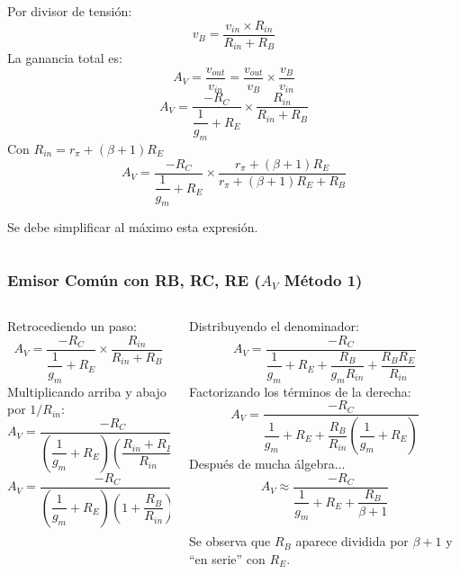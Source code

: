 \begin{frame}[t]
\begin{columns}
        \begin{column}{0.55\textwidth}
        
            Por divisor de tensión:
            \[ v_B = \dfrac{v_{in}\times R_{in}}{R_{in}+R_B} \]
            La ganancia total es:
            \[ A_V = \dfrac{v_{out}}{v_{in}} = \dfrac{v_{out}}{v_{B}}\times\dfrac{v_B}{v_{in}} \]
            \[ A_V = \dfrac{-R_C}{\dfrac{1}{g_m} + R_E} \times \dfrac{R_{in}}{R_{in}+R_B} \]
            Con $R_{in}=r_\pi + (\beta+1) R_E$
            \[ A_V = \dfrac{-R_C}{\dfrac{1}{g_m} + R_E} \times \dfrac{r_\pi + (\beta+1) R_E}{r_\pi + (\beta+1) R_E+R_B} \]
            
            Se debe simplificar al máximo esta expresión.
            
        \end{column}
        
    \end{columns}
    
\end{frame}

\begin{frame}[t]
    \frametitle{Emisor Común con RB, RC, RE ($A_V$ Método 1)}

    \begin{columns}
        \begin{column}{0.5\textwidth}
            Retrocediendo un paso:
            \[ A_V = \dfrac{-R_C}{\dfrac{1}{g_m} + R_E} \times \dfrac{R_{in}}{R_{in}+R_B} \]
            Multiplicando arriba y abajo por $1/{R_{in}}$:
            \[ A_V = \dfrac{-R_C}{(\dfrac{1}{g_m} + R_E) (\dfrac{R_{in}+R_B}{R_{in}})} \]
            \[ A_V = \dfrac{-R_C}{(\dfrac{1}{g_m} + R_E) (1+\dfrac{R_B}{R_{in}})} \]
        \end{column}
        \begin{column}{0.5\textwidth}
            Distribuyendo el denominador:
            \[ A_V = \dfrac{-R_C}{ \dfrac{1}{g_m} + R_E + \dfrac{R_B}{g_m R_{in}} + \dfrac{R_B R_E}{R_{in}} } \]
            Factorizando los términos de la derecha:
            \[ A_V = \dfrac{-R_C}{ \dfrac{1}{g_m} + R_E + \dfrac{R_B}{R_{in}}( \dfrac{1}{g_m} + R_E ) } \]
            Después de mucha álgebra...
            \[ \boxed{A_V \approx \dfrac{-R_C}{\dfrac{1}{g_m} + R_E + \dfrac{R_B}{\beta + 1}}} \]

            Se observa que $R_B$ aparece dividida por $\beta+1$ y ``en serie'' con $R_E$.
        \end{column}
    \end{columns}
\end{frame}

